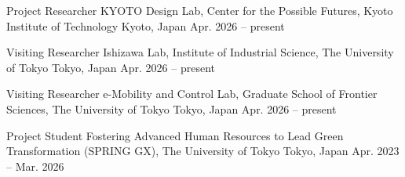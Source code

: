 

\begin{cventries}

  \cventry
    {Project Researcher} %
    {KYOTO Design Lab, Center for the Possible Futures, Kyoto Institute of Technology} %
    {Kyoto, Japan} %
    {Apr. 2026 -- present} %
    {}

  \cventry
    {Visiting Researcher} %
    {Ishizawa Lab, Institute of Industrial Science, The University of Tokyo} %
    {Tokyo, Japan} %
    {Apr. 2026 -- present} %
    {}

  \cventry
    {Visiting Researcher} %
    {e-Mobility and Control Lab, Graduate School of Frontier Sciences, The University of Tokyo} %
    {Tokyo, Japan} %
    {Apr. 2026 -- present} %
    {}

  \cventry
    {Project Student} %
    {Fostering Advanced Human Resources to Lead Green Transformation (SPRING GX), The University of Tokyo} %
    {Tokyo, Japan} %
    {Apr. 2023 -- Mar. 2026} %
    {}

\end{cventries}
